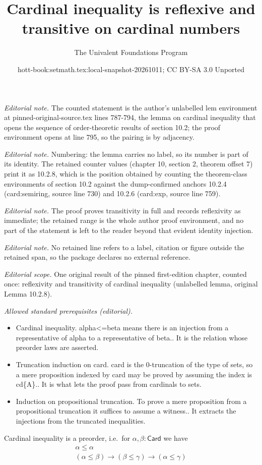 \documentclass[10pt,a4paper]{article}
\title{Cardinal inequality is reflexive and transitive on cardinal numbers}
\author{The Univalent Foundations Program}
\date{hott-book:setmath.tex:local-snapshot-20261011; CC BY-SA 3.0 Unported}
\newcounter{chapter}
\providecommand{\index}[1]{}
\newcommand{\card}{\ensuremath{\mathsf{Card}}\xspace}
\theoremstyle{definition}
\theoremstyle{remark}
\numberwithin{equation}{section}
\begin{document}
\maketitle
\setcounter{chapter}{10}
\setcounter{section}{2}
\setcounter{thm}{7}
\noindent\textit{Editorial note.} The counted statement is the author's unlabelled lem environment at pinned-original-source.tex lines 787-794, the lemma on cardinal inequality that opens the sequence of order-theoretic results of section 10.2; the proof environment opens at line 795, so the pairing is by adjacency.\par\medskip
\noindent\textit{Editorial note.} Numbering: the lemma carries no label, so its number is part of its identity. The retained counter values (chapter 10, section 2, theorem offset 7) print it as 10.2.8, which is the position obtained by counting the theorem-class environments of section 10.2 against the dump-confirmed anchors 10.2.4 (card:semiring, source line 730) and 10.2.6 (card:exp, source line 759).\par\medskip
\noindent\textit{Editorial note.} The proof proves transitivity in full and records reflexivity as immediate; the retained range is the whole author proof environment, and no part of the statement is left to the reader beyond that evident identity injection.\par\medskip
\noindent\textit{Editorial note.} No retained line refers to a label, citation or figure outside the retained span, so the package declares no external reference.\par\medskip
\noindent\textit{Editorial scope.} One original result of the pinned first-edition chapter, counted once: reflexivity and transitivity of cardinal inequality (unlabelled lemma, original Lemma 10.2.8).\par\medskip
\noindent\textit{Allowed standard prerequisites (editorial).}\begin{itemize}
\item Cardinal inequality. alpha<=beta means there is an injection from a representative of alpha to a representative of beta.. It is the relation whose preorder laws are asserted.
\item Truncation induction on card. card is the 0-truncation of the type of sets, so a mere proposition indexed by card may be proved by assuming the index is cd\{A\}.. It is what lets the proof pass from cardinals to sets.
\item Induction on propositional truncation. To prove a mere proposition from a propositional truncation it suffices to assume a witness.. It extracts the injections from the truncated inequalities.
\end{itemize}\medskip
\begin{lem}
  Cardinal inequality is a preorder, i.e.\ for $\alpha,\beta:\card$ we have
  \index{preorder!of cardinal numbers}%
  \begin{gather*}
    \alpha \le \alpha\\
    (\alpha \le \beta) \to (\beta\le\gamma) \to (\alpha\le\gamma)
  \end{gather*}
\end{lem}
\end{document}
